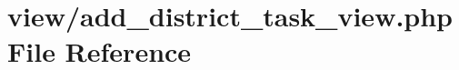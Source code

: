 \hypertarget{add__district__task__view_8php}{}\section{view/add\+\_\+district\+\_\+task\+\_\+view.php File Reference}
\label{add__district__task__view_8php}
